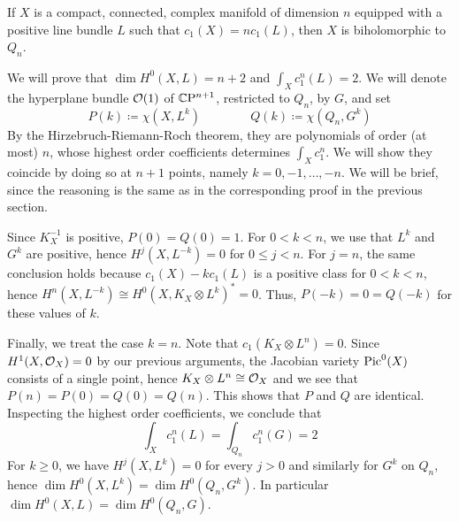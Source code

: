 \begin{cor}
	If $X$ is a compact, connected, complex manifold of dimension $n$ equipped with a positive line bundle $L$ such that $c_1(X)=nc_1(L)$, then $X$ is biholomorphic to $Q_n$.
\end{cor}
\begin{myproof}
	We will prove that $\dim H^0(X,L)=n+2$ and $\int_X c_1^n(L)=2$. We will denote the hyperplane bundle $\mathcal{O}(1)$ of $\mathbb{C}\mathrm{P}^{n+1}$, restricted to $Q_n$, by $G$, and set 
	\begin{equation*}
		P(k)\coloneqq \chi(X,L^k) \qquad \qquad Q(k)\coloneqq \chi(Q_n,G^k)
	\end{equation*}
	By the Hirzebruch-Riemann-Roch theorem, they are polynomials of order (at most) $n$, whose highest order coefficients determines $\int_X c_1^n$. We will show they coincide by doing so at $n+1$ points, namely $k=0,-1,\dots,-n$. We will be brief, since the reasoning is the same as in the corresponding proof in the previous section. 
	
	Since $K^{-1}_X$ is positive, $P(0)=Q(0)=1$. For $0<k<n$, we use that $L^k$ and $G^k$ are positive, hence $H^j(X,L^{-k})=0$ for $0\leq j<n$. For $j=n$, the same conclusion holds because $c_1(X)-kc_1(L)$ is a positive class for $0<k<n$, hence $H^n(X,L^{-k})\cong H^0(X,K_X\otimes L^k)^*=0$. Thus, $P(-k)=0=Q(-k)$ for these values of $k$. 
	
	Finally, we treat the case $k=n$. Note that $c_1(K_X\otimes L^n)=0$. Since $H^1(X,\mathcal{O}_X)=0$ by our previous arguments, the Jacobian variety $\operatorname{Pic}^0(X)$ consists of a single point, hence $K_X\otimes L^n\cong \mathcal{O}_X$ and we see that $P(n)=P(0)=Q(0)=Q(n)$. This shows that $P$ and $Q$ are identical. Inspecting the highest order coefficients, we conclude that 
	\begin{equation*}
		\int_X c_1^n(L)=\int_{Q_n}c_1^n(G)=2
	\end{equation*}
	For $k\geq 0$, we have $H^j(X,L^k)=0$ for every $j>0$ and similarly for $G^k$ on $Q_n$, hence $\dim H^0(X,L^k)=\dim H^0(Q_n,G^k)$. In particular $\dim H^0(X,L)=\dim H^0(Q_n,G)$. 
	

\end{myproof}
